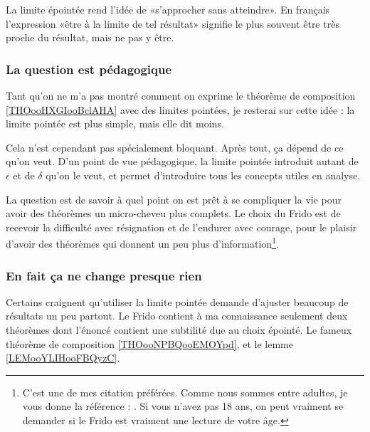 La limite épointée rend l'idée de «s'approcher sans atteindre». En français l'expression «être à la limite de tel résultat» signifie le plus souvent être très proche du résultat, mais ne pas y être.

\subsubsection{La question est pédagogique}

Tant qu'on ne m'a pas montré comment on exprime le théorème de composition \ref{THOooHXGIooBclAHA} avec des limites pointées, je resterai sur cette idée : la limite pointée est plus simple, mais elle dit moins.

Cela n'est cependant pas spécialement bloquant. Après tout, ça dépend de ce qu'on veut. D'un point de vue pédagogique, la limite pointée introduit autant de \( \epsilon\) et de \( \delta\) qu'on le veut, et permet d'introduire tous les concepts utiles en analyse.

La question est de savoir à quel point on est prêt à se compliquer la vie pour avoir des théorèmes un micro-cheveu plus complets. Le choix du Frido est de recevoir la difficulté avec résignation et de l'endurer avec courage, pour le plaisir d'avoir des théorèmes qui donnent un peu plus d'information\footnote{C'est une de mes citation préférées. Comme nous sommes entre adultes, je vous donne la référence : \cite{BIBooTOVWooSDsNrc}. Si vous n'avez pas 18 ans, on peut vraiment se demander si le Frido est vraiment une lecture de votre âge.}.

\subsubsection{En fait ça ne change presque rien}

Certains craignent qu'utiliser la limite pointée demande d'ajuster beaucoup de résultats un peu partout\cite{BIBooTOVWooSDsNrc}. Le Frido contient à ma connaissance seulement deux théorèmes dont l'énoncé contient une subtilité due au choix épointé. Le fameux théorème de composition \ref{THOooNPBQooEMOYpd}, et le lemme \ref{LEMooYLIHooFBQyzC}.

